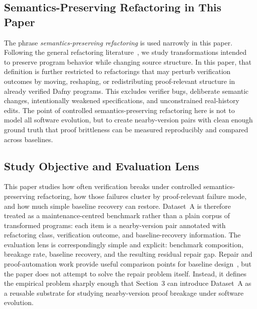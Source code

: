 \subsection{Semantics-Preserving Refactoring in This Paper}

The phrase \emph{semantics-preserving refactoring} is used narrowly in this paper. Following the general refactoring literature~\cite{Mens2004RefactoringSurvey,Kim2012RefactoringInTheWild,Tsantalis2014RefactoringOperations}, we study transformations intended to preserve program behavior while changing source structure. In this paper, that definition is further restricted to refactorings that may perturb verification outcomes by moving, reshaping, or redistributing proof-relevant structure in already verified Dafny programs. This excludes verifier bugs, deliberate semantic changes, intentionally weakened specifications, and unconstrained real-history edits. The point of controlled semantics-preserving refactoring here is not to model all software evolution, but to create nearby-version pairs with clean enough ground truth that proof brittleness can be measured reproducibly and compared across baselines.

\subsection{Study Objective and Evaluation Lens}

This paper studies how often verification breaks under controlled semantics-preserving refactoring, how those failures cluster by proof-relevant failure mode, and how much simple baseline recovery can restore. Dataset~A is therefore treated as a maintenance-centred benchmark rather than a plain corpus of transformed programs: each item is a nearby-version pair annotated with refactoring class, verification outcome, and baseline-recovery information. The evaluation lens is correspondingly simple and explicit: benchmark composition, breakage rate, baseline recovery, and the resulting residual repair gap. Repair and proof-automation work provide useful comparison points for baseline design~\cite{Gazzola2017AutomaticSoftwareRepair,First2020TacTok,SanchezStern2023Passport}, but the paper does not attempt to solve the repair problem itself. Instead, it defines the empirical problem sharply enough that Section~3 can introduce Dataset~A as a reusable substrate for studying nearby-version proof breakage under software evolution.
